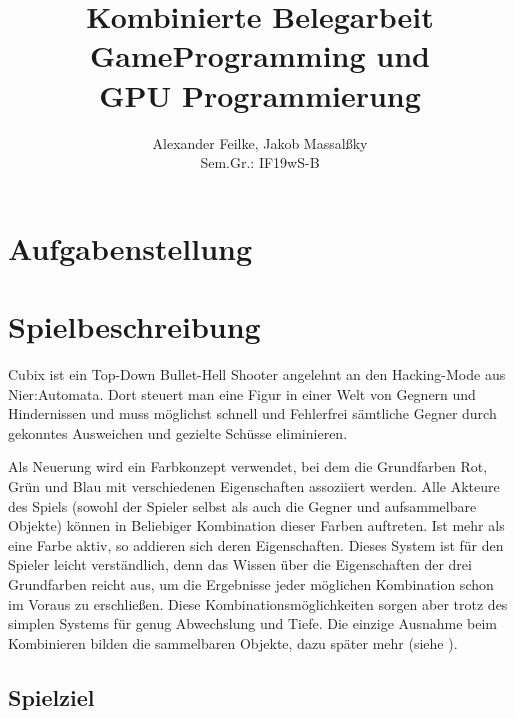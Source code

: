 \documentclass[a4paper,10pt,ngerman,fontsize=12pt]{scrreprt}
\title{Kombinierte Belegarbeit \\ GameProgramming und \\ GPU Programmierung}
\author{Alexander Feilke, Jakob Massal{\ss}ky \\ Sem.Gr.: IF19wS-B}
\begin{document}
\normalfont

\maketitle
\newpage %

\renewcommand{\contentsname}{Inhaltsverzeichnis}
\tableofcontents
\newpage


\sloppy
\flushbottom



\chapter{Aufgabenstellung}
\lipsum[3]





\chapter{Spielbeschreibung}

Cubix ist ein Top-Down Bullet-Hell Shooter angelehnt an den Hacking-Mode aus Nier:Automata\cite{qNierHM}.
Dort steuert man eine Figur in einer Welt von Gegnern und Hindernissen und muss möglichst schnell und Fehlerfrei sämtliche Gegner durch gekonntes Ausweichen und gezielte Schüsse eliminieren.

Als Neuerung wird ein Farbkonzept verwendet, bei dem die Grundfarben Rot, Grün und Blau mit verschiedenen Eigenschaften assoziiert werden. Alle Akteure des Spiels (sowohl der Spieler selbst als auch die Gegner und aufsammelbare Objekte) können in Beliebiger Kombination dieser Farben auftreten. Ist mehr als eine Farbe aktiv, so addieren sich deren Eigenschaften. Dieses System ist für den Spieler leicht verständlich, denn das Wissen über die Eigenschaften der drei Grundfarben reicht aus, um die Ergebnisse jeder möglichen Kombination schon im Voraus zu erschlie{\ss}en. Diese Kombinationsmöglichkeiten sorgen aber trotz des simplen Systems für genug Abwechslung und Tiefe. Die einzige Ausnahme beim Kombinieren bilden die sammelbaren Objekte, dazu später mehr (siehe ).




\section{Spielziel}
\end{document}
